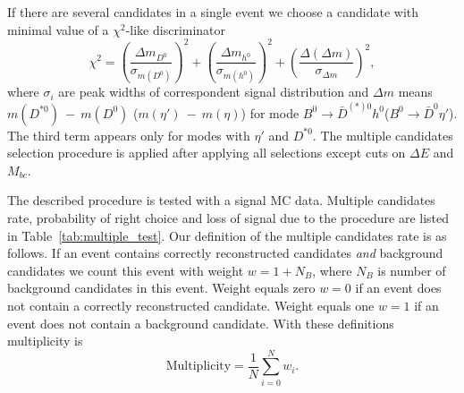 \documentclass[preprint,aps,showpacs]{revtex4}
\newcommand{\bdh}{\ensuremath{B^0\to \bar D^0h^0}\xspace}
\newcommand{\bdsth}{\ensuremath{B^0\to \bar D^{(*)0}h^0}\xspace}
\newcommand{\bdpi}{\ensuremath{B^0\to \bar D^0\pi^0}\xspace}
\newcommand{\bdeta}{\ensuremath{B^0\to \bar D^0\eta}\xspace}
\newcommand{\bdetap}{\ensuremath{B^0\to \bar D^0\eta\prime}\xspace}
\newcommand{\btodstpi}{\ensuremath{B^0\to \bar D^{*0}\pi^0}\xspace}
\newcommand{\btodsteta}{\ensuremath{B^0\to \bar D^{*0}\eta}\xspace}
\newcommand{\etagg}{\ensuremath{\eta\to\gamma\gamma}\xspace}
\newcommand{\de}{\ensuremath{\Delta E}\xspace}
\newcommand{\mbc}{\ensuremath{M_{bc}}\xspace}
\begin{document}


If there are several candidates in a single event we choose a candidate with minimal value of a $\chi^2$-like discriminator
\begin{equation}\label{eq:multi_chi}
 \chi^2 = \left(\frac{\Delta m_{D^0}}{\sigma_{m(D^0)}}\right)^2 + \left(\frac{\Delta m_{h^0}}{\sigma_{m(h^0)}}\right)^2 + \left(\frac{\Delta (\Delta m)}{\sigma_{\Delta m}}\right)^2,
\end{equation}
where $\sigma_i$ are peak widths of correspondent signal distribution and $\Delta m$ means $m(D^{*0})~-~m(D^0)$ ($m(\eta\prime)~-~m(\eta)$) for mode \bdsth (\bdetap). The third term appears only for modes with $\eta\prime$ and $D^{*0}$. The multiple candidates selection procedure is applied after applying all selections except cuts on \de and \mbc.

The described procedure is tested with a signal MC data. Multiple candidates rate, probability of right choice and loss of signal due to the procedure are listed in Table~\ref{tab:multiple_test}. Our definition of the multiple candidates rate is as follows. If an event contains correctly reconstructed candidates {\it and} background candidates we count this event with weight $w=1+N_B$, where $N_B$ is number of background candidates in this event. Weight equals zero $w=0$ if an event does not contain a correctly reconstructed candidate. Weight equals one $w=1$ if an event does not contain a background candidate. With these definitions multiplicity is
\begin{equation}\label{eq:multpl}
 \text{Multiplicity} = \frac{1}{N}\sum\limits_{i=0}^{N}w_i.
\end{equation}
\end{document}
